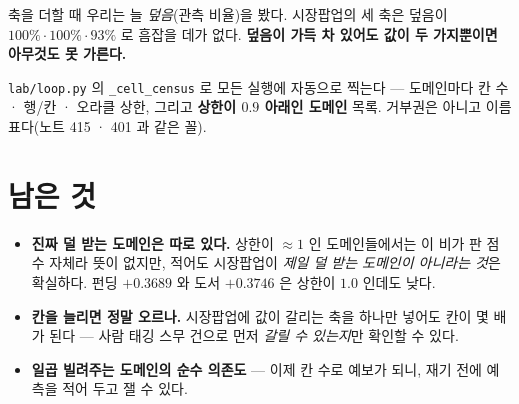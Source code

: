 \documentclass[11pt]{article}
\begin{document}
축을 더할 때 우리는 늘 \emph{덮음}(관측 비율)을 봤다. 시장팝업의 세 축은
덮음이 $100\% \cdot 100\% \cdot 93\%$ 로 흠잡을 데가 없다. \textbf{덮음이
가득 차 있어도 값이 두 가지뿐이면 아무것도 못 가른다.}

\texttt{lab/loop.py} 의 \texttt{\_cell\_census} 로 모든 실행에 자동으로
찍는다 --- 도메인마다 칸 수 · 행/칸 · 오라클 상한, 그리고 \textbf{상한이
$0.9$ 아래인 도메인} 목록. 거부권은 아니고 이름표다(노트 415 · 401 과
같은 꼴).

\section*{남은 것}

\begin{itemize}
\item \textbf{진짜 덜 받는 도메인은 따로 있다.} 상한이 $\approx 1$ 인
도메인들에서는 이 비가 판 점수 자체라 뜻이 없지만, 적어도 시장팝업이
\emph{제일 덜 받는 도메인이 아니라는 것}은 확실하다. 펀딩 $+0.3689$ 와
도서 $+0.3746$ 은 상한이 $1.0$ 인데도 낮다.
\item \textbf{칸을 늘리면 정말 오르나.} 시장팝업에 값이 갈리는 축을
하나만 넣어도 칸이 몇 배가 된다 --- 사람 태깅 스무 건으로 먼저
\emph{갈릴 수 있는지}만 확인할 수 있다.
\item \textbf{일곱 빌려주는 도메인의 순수 의존도} --- 이제 칸 수로
예보가 되니, 재기 전에 예측을 적어 두고 잴 수 있다.
\end{itemize}
\end{document}
